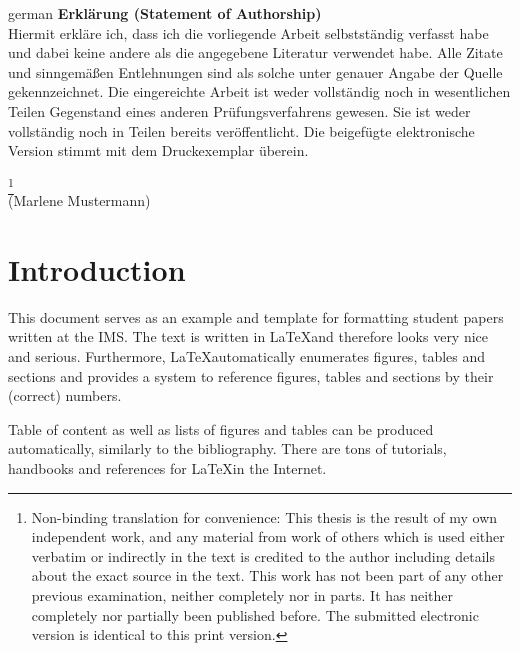 \documentclass[12pt,leqno,a4paper]{article}
\begin{document}
\begin{otherlanguage}
{german}
\noindent\textbf{Erklärung (Statement of Authorship)}\\


\noindent Hiermit erkläre ich, dass ich die vorliegende Arbeit selbstständig verfasst habe und dabei keine andere als die angegebene Literatur verwendet habe. Alle Zitate und sinngemäßen Entlehnungen sind als solche unter genauer Angabe der Quelle gekennzeichnet. Die eingereichte Arbeit ist weder vollständig noch in wesentlichen Teilen Gegenstand eines anderen Prüfungsverfahrens gewesen. Sie ist weder vollständig noch in Teilen bereits veröffentlicht. Die beigefügte elektronische Version stimmt mit dem Druckexemplar überein.%
\end{otherlanguage}
\footnote{Non-binding translation for convenience: This thesis is the result of my own independent work, and any material from work of others which is used either verbatim or indirectly in the text is credited to the author including details about the exact source in the text. This work has not been part of any other previous examination, neither completely nor in parts. It has neither completely nor partially been published before. The submitted electronic version is identical to this print version.}\\[2cm]


\noindent (Marlene Mustermann)


\newpage

\tableofcontents
\newpage

\section{Introduction}
This document serves as an example and template for formatting student papers written at the IMS. The text is written in \LaTeX and therefore looks very nice and serious. Furthermore, \LaTeX automatically enumerates figures, tables and sections and provides a system to reference figures, tables and sections by their (correct) numbers. 

Table of content as well as lists of figures and tables can be produced automatically, similarly to the bibliography. There are tons of tutorials, handbooks and references for \LaTeX in the Internet. 
\end{document}
